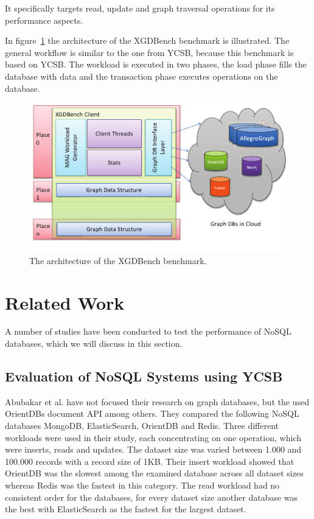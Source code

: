 It specifically targets read,
update and graph traversal operations for its performance aspects.~\cite[366]{Dayarathna2012}

In figure~\ref{fig:XGDBenchArchitecture} the architecture of the XGDBench benchmark is illustrated.
The general workflow is similar to the one from YCSB,
because this benchmark is based on YCSB.
The workload is executed in two phases,
the load phase fills the database with data and the transaction phase executes operations on the database.

\begin{figure}[h!]
  \centering
  \includegraphics[width=.75\textwidth]{images/benchmarks/XGDBenchArchitecture}
  \caption{The architecture of the XGDBench benchmark.~\cite[367]{Dayarathna2012}}
  \label{fig:XGDBenchArchitecture}
\end{figure}

\section{Related Work}
A number of studies have been conducted to test the performance of NoSQL databases,
which we will discuss in this section.

\subsection{Evaluation of NoSQL Systems using YCSB}
Abubakar et al. have not focused their research on graph databases,
but the used OrientDBs document API among others.
They compared the following NoSQL databases MongoDB, ElasticSearch, OrientDB and Redis.
Three different workloads were used in their study,
each concentrating on one operation,
which were inserts, reads and updates.
The dataset size was varied between 1.000 and 100.000 records with a record size of 1KB.
Their insert workload showed that OrientDB was the slowest among the examined database across all dataset sizes whereas Redis was the fastest in this category.
The read workload had no consistent order for the databases,
for every dataset size another database was the best with ElasticSearch as the fastest for the largest dataset.~\cite{Abubakar2014}

